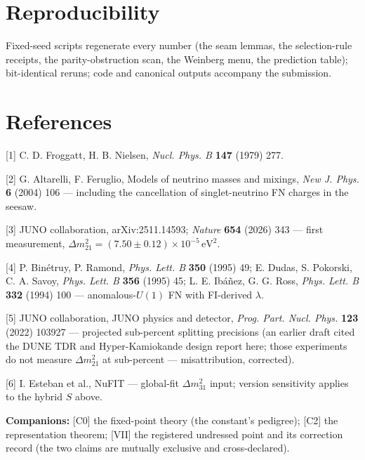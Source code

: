 \documentclass[11pt]{article}
\begin{document}
\section*{Reproducibility}
Fixed-seed scripts regenerate every number (the seam lemmas, the selection-rule receipts, the parity-obstruction scan, the Weinberg menu, the prediction table); bit-identical reruns; code and canonical outputs accompany the submission.

\section*{References}
[1] C. D. Froggatt, H. B. Nielsen, \emph{Nucl. Phys. B} \textbf{147} (1979) 277.

[2] G. Altarelli, F. Feruglio, Models of neutrino masses and mixings, \emph{New J. Phys.} \textbf{6} (2004) 106 — including the cancellation of singlet-neutrino FN charges in the seesaw.

[3] JUNO collaboration, arXiv:2511.14593; \emph{Nature} \textbf{654} (2026) 343 — first measurement, $\Delta m^2_{21} = (7.50 \pm 0.12)\times 10^{-5}\,\mathrm{eV}^2$.

[4] P. Binétruy, P. Ramond, \emph{Phys. Lett. B} \textbf{350} (1995) 49; E. Dudas, S. Pokorski, C. A. Savoy, \emph{Phys. Lett. B} \textbf{356} (1995) 45; L. E. Ibáñez, G. G. Ross, \emph{Phys. Lett. B} \textbf{332} (1994) 100 — anomalous-$U(1)$ FN with FI-derived $\lambda$.

[5] JUNO collaboration, JUNO physics and detector, \emph{Prog. Part. Nucl. Phys.} \textbf{123} (2022) 103927 — projected sub-percent splitting precisions (an earlier draft cited the DUNE TDR and Hyper-Kamiokande design report here; those experiments do not measure $\Delta m^2_{21}$ at sub-percent — misattribution, corrected).

[6] I. Esteban et al., NuFIT — global-fit $\Delta m^2_{31}$ input; version sensitivity applies to the hybrid $S$ above.

\textbf{Companions:} [C0] the fixed-point theory (the constant's pedigree); [C2] the representation theorem; [VII] the registered undressed point and its correction record (the two claims are mutually exclusive and cross-declared).
\end{document}

